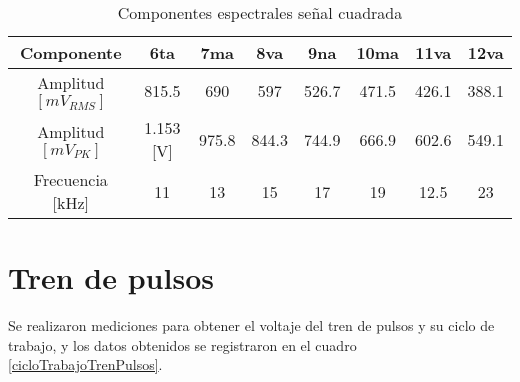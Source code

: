 \documentclass{article}
\begin{document}

\begin{table}[h!]
\centering

\begin{tabular}{|c|c|c|c|c|c|c|c|}
\hline
Componente            & 6ta           & 7ma   & 8va   & 9na   & 10ma  & 11va  & 12va  \\ \hline
Amplitud $[mV_{RMS}]$ & 815.5         & 690   & 597   & 526.7 & 471.5 & 426.1 & 388.1 \\ \hline
Amplitud $[mV_{PK}]$  & 1.153 {[}V{]} & 975.8 & 844.3 & 744.9 & 666.9 & 602.6 & 549.1 \\ \hline
Frecuencia {[}kHz{]}  & 11            & 13    & 15    & 17    & 19    & 12.5  & 23    \\ \hline
\end{tabular}

\caption{Componentes espectrales señal cuadrada}
\label{senalCuadradaTablaB}


\end{table}


\section{Tren de pulsos}

Se realizaron mediciones para obtener el voltaje del tren de pulsos y su ciclo de trabajo, y los datos obtenidos se registraron en el cuadro \ref{cicloTrabajoTrenPulsos}.\\
\end{document}
